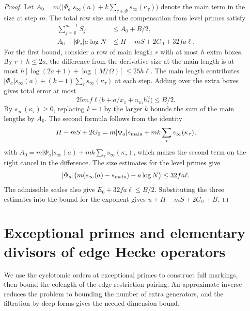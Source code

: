 \begin{proof}
Let $A_0=m\bigl(|\Phi_a|s_\infty(a)+k\sum_{\tau\in\Phi}s_\infty(\kappa_\tau)\bigr)$ denote the main term in the size at step $m$. The total row size and the compensation from level primes satisfy
\[
 \begin{aligned}
 \sum_{j=0}^{m-1} S_j&\le A_0+B/2,\\
 A_0-|\Phi_a|a\log N&\le H-mS+2G_0+32fa\ell .
 \end{aligned}
\]
For the first bound, consider a row of main length $r$ with at most $h$ extra boxes. By $r+h\le2a$, the difference from the derivative size at the main length is at most
$h[\log(2a+1)+\log(M/\Omega)]\le25h\ell$. The main length contributes $|\Phi_a|s_\infty(a)+(k-1)\sum_\tau s_\infty(\kappa_\tau)$ at each step. Adding over the extra boxes gives total error at most
\[
 25mf\ell\bigl(b+a/x_1+n_mh_*^2\bigr)\le B/2 .
\]
By $s_\infty(\kappa_\tau)\ge0$, replacing $k-1$ by the larger $k$ bounds the sum of the main lengths by $A_0$. The second formula follows from the identity
\[
 H-mS+2G_0
 =m|\Phi_a|s_{\rm main}
   +mk\sum_{\tau}s_\infty(\kappa_\tau),
\]
with $A_0=m|\Phi_a|s_\infty(a)+mk\sum_\tau s_\infty(\kappa_\tau)$, which makes the second term on the right cancel in the difference. The size estimates for the level primes give
\[
 |\Phi_a|\bigl(m(s_\infty(a)-s_{\rm main})-a\log N\bigr)\le32fa\ell .
\]
The admissible scales also give $E_0+32fa\ell\le B/2$. Substituting the three estimates into the bound for the exponent gives $u+H-mS+2G_0+B$.
\end{proof}

\section{Exceptional primes and elementary divisors of edge Hecke operators}
\label{sec:a-hecke}

We use the cyclotomic orders at exceptional primes to construct full markings, then bound the colength of the edge restriction pairing. An approximate inverse reduces the problem to bounding the number of extra generators, and the filtration by deep forms gives the needed dimension bound.

